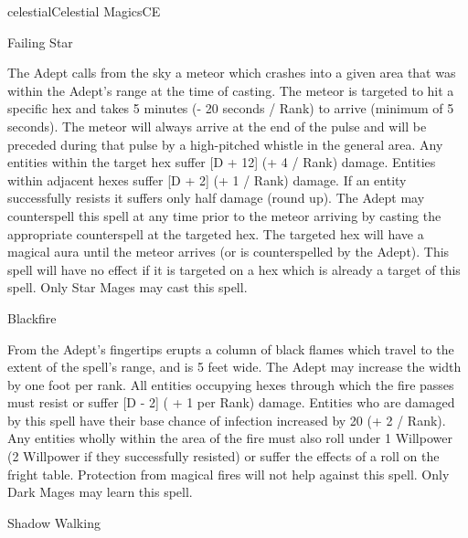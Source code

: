 \begin{college}[1.3]{celestial}{Celestial Magics}{CE}
\begin{spell}[S-10 Star]{Failing Star}
\begin{effects}
The Adept calls from the sky a meteor which crashes into a given area
that was within the Adept's range at the time of casting.  The meteor
is targeted to hit a specific hex and takes 5 minutes (- 20 seconds /
Rank) to arrive (minimum of 5 seconds).  The meteor will always arrive
at the end of the pulse and will be preceded during that pulse by a
high-pitched whistle in the general area.  Any entities within the
target hex suffer [D + 12] (+ 4 / Rank) damage.  Entities within
adjacent hexes suffer [D + 2] (+ 1 / Rank) damage.  If an entity
successfully resists it suffers only half damage (round up).  The
Adept may counterspell this spell at any time prior to the meteor
arriving by casting the appropriate counterspell at the targeted hex.
The targeted hex will have a magical aura until the meteor arrives (or
is counterspelled by the Adept).  This spell will have no effect if it
is targeted on a hex which is already a target of this spell. Only
Star Mages may cast this spell.
\end{effects}
\end{spell}

\begin{spell}[S-10 Dark]{Blackfire}

\begin{effects}
From the Adept's fingertips erupts a column of black flames which
travel to the extent of the spell's range, and is 5 feet wide.  The
Adept may increase the width by one foot per rank.  All entities
occupying hexes through which the fire passes must resist or suffer [D
- 2] ( + 1 per Rank) damage.  Entities who are damaged by this spell
have their base chance of infection increased by 20 (+ 2 / Rank).  Any
entities wholly within the area of the fire must also roll under 1 \x
Willpower (2 \x Willpower if they successfully resisted) or suffer the
effects of a roll on the fright table.  Protection from magical fires
will not help against this spell.  Only Dark Mages may learn this
spell.
\end{effects}
\end{spell}


\begin{spell}[S-10 Shadow]{Shadow Walking}


\end{spell}
\end{college}
